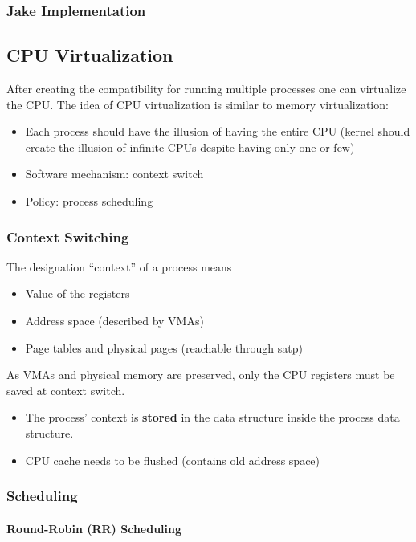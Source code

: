 \subsubsection{Jake Implementation}

\subsection{CPU Virtualization}
After creating the compatibility for running multiple processes one can virtualize the CPU. The idea of CPU virtualization is similar to memory virtualization:
\begin{itemize}
    \item Each process should have the illusion of having the entire CPU (kernel should create the illusion of infinite CPUs despite having only one or few)
    \item Software mechanism: context switch
    \item Policy: process scheduling
\end{itemize}
\subsubsection{Context Switching}
The designation ``context'' of a process means
\begin{itemize}
    \item Value of the registers
    \item Address space (described by VMAs)
    \item Page tables and physical pages (reachable through satp)
\end{itemize}
As VMAs and physical memory are preserved, only the CPU registers must be saved at context switch.

\begin{itemize}
    \item The process' context is \textbf{stored} in the  data structure inside the process data structure.
    \item CPU cache needs to be flushed (contains old address space)
\end{itemize}

\subsubsection{Scheduling}
\paragraph{Round-Robin (RR) Scheduling}

